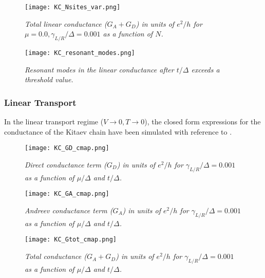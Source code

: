 \clearpage 

\vspace*{1.5cm}

\begin{figure}[h]
\centering
\texttt{[image: KC\_Nsites\_var.png]}
\caption{\textit{Total linear conductance ($G_{A}+G_{D}$) in units of $e^{2}/h$ for $\mu = 0.0, \gamma_{L/R}/\Delta = 0.001$ as a function of $N$.}}
\end{figure}

\vspace{0.6cm}

\begin{figure}[h]
\centering
\texttt{[image: KC\_resonant\_modes.png]}
\caption{\textit{Resonant modes in the linear conductance after $t/\Delta$ exceeds a threshold value.}}
\end{figure}

\clearpage

\subsubsection{Linear Transport}

In the linear transport regime ($V \rightarrow 0, T \rightarrow 0$), the closed form expressions for the conductance of the Kitaev chain have been simulated with reference to \cite{transport_paper}. 

\vspace{0.6cm}

\begin{figure}[h]
\centering
\texttt{[image: KC\_GD\_cmap.png]}
\caption{\textit{Direct conductance term ($G_{D}$) in units of $e^{2}/h$ for $\gamma_{L/R}/\Delta = 0.001$ as a function of $\mu/\Delta$ and $t/\Delta$.}}
\end{figure}

\vspace{0.5cm}

\begin{figure}[h]
\centering
\texttt{[image: KC\_GA\_cmap.png]}
\caption{\textit{Andreev conductance term ($G_{A}$) in units of $e^{2}/h$ for $\gamma_{L/R}/\Delta = 0.001$ as a function of $\mu/\Delta$ and $t/\Delta$.}}
\end{figure}

\clearpage

\vspace*{3cm}

\begin{figure}[h]
\centering
\texttt{[image: KC\_Gtot\_cmap.png]}
\caption{\textit{Total conductance ($G_{A}+G_{D}$) in units of $e^{2}/h$ for $\gamma_{L/R}/\Delta = 0.001$ as a function of $\mu/\Delta$ and $t/\Delta$.}}
\end{figure}

